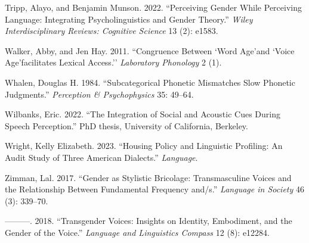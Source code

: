 \documentclass[
  letterpaper,
  DIV=11,
  numbers=noendperiod]{scrartcl}
\newlength{\cslhangindent}
\newenvironment{CSLReferences}[2] %
 {\begin{list}{}{%
  \setlength{\itemindent}{0pt}
  \setlength{\leftmargin}{0pt}
  \setlength{\parsep}{0pt}
  \ifodd #1
   \setlength{\leftmargin}{\cslhangindent}
   \setlength{\itemindent}{-1\cslhangindent}
  \fi
  \setlength{\itemsep}{#2\baselineskip}}}
 {\end{list}}
\begin{document}
\begin{CSLReferences}{1}{0}
Tripp, Alayo, and Benjamin Munson. 2022. {``Perceiving Gender While
Perceiving Language: Integrating Psycholinguistics and Gender Theory.''}
\emph{Wiley Interdisciplinary Reviews: Cognitive Science} 13 (2): e1583.

Walker, Abby, and Jen Hay. 2011. {``Congruence Between `Word Age'and
`Voice Age'facilitates Lexical Access.''} \emph{Laboratory Phonology} 2
(1).

Whalen, Douglas H. 1984. {``Subcategorical Phonetic Mismatches Slow
Phonetic Judgments.''} \emph{Perception \& {Psychophysics}} 35: 49--64.

Wilbanks, Eric. 2022. {``The Integration of Social and Acoustic Cues
During Speech Perception.''} PhD thesis, University of California,
Berkeley.

Wright, Kelly Elizabeth. 2023. {``Housing Policy and Linguistic
Profiling: An Audit Study of Three American Dialects.''}
\emph{Language}.

Zimman, Lal. 2017. {``Gender as Stylistic Bricolage: Transmasculine
Voices and the Relationship Between Fundamental Frequency and/s.''}
\emph{Language in Society} 46 (3): 339--70.

---------. 2018. {``Transgender Voices: Insights on Identity,
Embodiment, and the Gender of the Voice.''} \emph{Language and
Linguistics Compass} 12 (8): e12284.

\end{CSLReferences}
\end{document}
